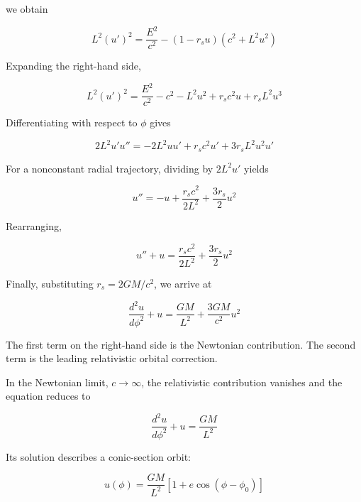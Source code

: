 \documentclass[pdflatex,sn-mathphys-num]{sn-jnl}%
\theoremstyle{thmstyleone}%
\theoremstyle{thmstyletwo}%
\theoremstyle{thmstylethree}%
\begin{document}
\begin{appendices}
we obtain

\begin{equation}
    L^2(u')^2
    =
    \frac{E^2}{c^2}
    -
    (1-r_su)(c^2+L^2u^2)
\end{equation}

Expanding the right-hand side,

\begin{equation}
    L^2(u')^2
    =
    \frac{E^2}{c^2}
    -c^2
    -L^2u^2
    +r_sc^2u
    +r_sL^2u^3
\end{equation}

Differentiating with respect to $\phi$ gives

\begin{equation}
    2L^2u'u''
    =
    -2L^2uu'
    +r_sc^2u'
    +3r_sL^2u^2u'
\end{equation}

For a nonconstant radial trajectory, dividing by $2L^2u'$ yields

\begin{equation}
    u''
    =
    -u
    +
    \frac{r_sc^2}{2L^2}
    +
    \frac{3r_s}{2}u^2
\end{equation}

Rearranging,

\begin{equation}
    u''+u
    =
    \frac{r_sc^2}{2L^2}
    +
    \frac{3r_s}{2}u^2
\end{equation}

Finally, substituting $r_s=2GM/c^2$, we arrive at

\begin{equation}
    \boxed{
    \frac{d^2u}{d\phi^2}+u
    =
    \frac{GM}{L^2}
    +
    \frac{3GM}{c^2}u^2
    }
\end{equation}

The first term on the right-hand side is the Newtonian contribution. The second term is the leading relativistic orbital correction.

In the Newtonian limit, $c\rightarrow\infty$, the relativistic contribution vanishes and the equation reduces to

\begin{equation}
    \frac{d^2u}{d\phi^2}+u
    =
    \frac{GM}{L^2}
\end{equation}

Its solution describes a conic-section orbit:

\begin{equation}
    u(\phi)
    =
    \frac{GM}{L^2}
    \left[1+e\cos(\phi-\phi_0)\right]
\end{equation}


\end{appendices}
\end{document}
